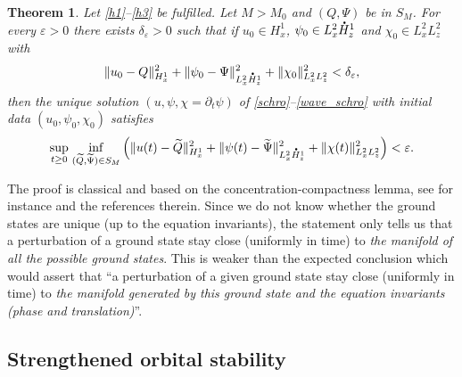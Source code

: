 \documentclass[10pt]{amsart}
\newtheorem{theo}[lemma]{Theorem}
\theoremstyle{definition}
\newcommand*{\overbigdot}[1]{%
\accentset{\mbox{\large\bfseries .}}{#1}}
\begin{document}
\begin{theo}\label{orbital_stab_1}
Let \eqref{h1}--\eqref{h3} be fulfilled. Let $M>M_{0}$ and $(Q,\Psi)$ be in $S_{M}$. For every $\varepsilon>0$ there exists $\delta_{\varepsilon}>0$ such that if $u_{0}\in H_{x}^{1}$, $\psi_{0}\in L_{x}^{2}\overbigdot{H}_{z}^{1}$ and $\chi_{0}\in L_{x}^{2}L_{z}^{2}$ with
\[
\|u_{0}-Q\|_{H_{x}^{1}}^{2}+\|\psi_{0}-\Psi\|_{L_{x}^{2}\overbigdot{H}_{z}^{1}}^{2}+\|\chi_{0}\|_{L_{x}^{2}L_{z}^{2}}^{2}<\delta_{\varepsilon},
\]
then the unique solution $(u,\psi,\chi=\partial_t\psi)$ of \eqref{schro}--\eqref{wave_schro} with initial data $(u_{0},\psi_{0},\chi_{0})$ satisfies
\[
\underset{t\geq 0}{\sup}\;\underset{(\widetilde{Q},\widetilde{\Psi})\in S_{M}}{\inf}\left(\|u(t)-\widetilde{Q}\|_{H_{x}^{1}}^{2}+\|\psi(t)-\widetilde{\Psi}\|_{L_{x}^{2}\overbigdot{H}_{z}^{1}}^{2}+\|\chi(t)\|_{L_{x}^{2}L_{z}^{2}}^{2}\right)<\varepsilon.
\]
\end{theo}
The proof is classical and based on the concentration-compactness lemma, see for instance \cite{Cazenave_Lions_orbital_stab, PLLcc1, PLLcc2} and the references therein.
Since we do not know whether the ground states are unique (up to the equation invariants),
the statement
only tells us that a perturbation of a ground state stay close (uniformly in time) to \emph{the manifold of all the possible ground states}.
This is weaker than the
expected conclusion which would assert that ``a perturbation of a given ground state stay close (uniformly in time) to \emph{the manifold generated by this ground state and the equation invariants (phase and translation)}''.

\subsection{Strengthened orbital stability}
\end{document}
